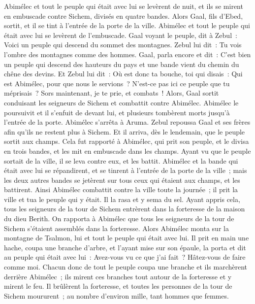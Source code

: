 \begin{multicols}{2}
Abimélec et tout le peuple qui était avec lui se levèrent de nuit, et ils se mirent en embuscade contre Sichem, divisés en quatre bandes.
Alors Gaal, fils d'Ebed, sortit, et il se tint à l'entrée de la porte de la ville. Abimélec et tout le peuple qui était avec lui se levèrent de l'embuscade.
Gaal voyant le peuple, dit à Zebul~: Voici un peuple qui descend du sommet des montagnes. Zebul lui dit~: Tu vois l'ombre des montagnes comme des hommes.
Gaal, parla encore et dit~: C'est bien un peuple qui descend des hauteurs du pays et une bande vient du chemin du chêne des devins.
Et Zebul lui dit~: Où est donc ta bouche, toi qui disais~: Qui est Abimélec, pour que nous le servions~? N'est-ce pas ici ce peuple que tu méprisais~? Sors maintenant, je te prie, et combats~!
Alors, Gaal sortit conduisant les seigneurs de Sichem et combattit contre Abimélec.
Abimélec le poursuivit et il s'enfuit de devant lui, et plusieurs tombèrent morts jusqu'à l'entrée de la porte.
Abimélec s'arrêta à Aruma. Zebul repoussa Gaal et ses frères afin qu'ils ne restent plus à Sichem.
Et il arriva, dès le lendemain, que le peuple sortit aux champs. Cela fut rapporté à Abimélec,
qui prit son peuple, et le divisa en trois bandes, et les mit en embuscade dans les champs. Ayant vu que le peuple sortait de la ville, il se leva contre eux, et les battit.
Abimélec et la bande qui était avec lui se répandirent, et se tinrent à l'entrée de la porte de la ville~; mais les deux autres bandes se jetèrent sur tous ceux qui étaient aux champs, et les battirent.
Ainsi Abimélec combattit contre la ville toute la journée~; il prit la ville et tua le peuple qui y était. Il la rasa et y sema du sel.
Ayant appris cela, tous les seigneurs de la tour de Sichem entrèrent dans la forteresse de la maison du dieu Berith.
On rapporta à Abimélec que tous les seigneurs de la tour de Sichem s'étaient assemblés dans la forteresse.
Alors Abimélec monta sur la montagne de Tsalmon, lui et tout le peuple qui était avec lui. Il prit en main une hache, coupa une branche d'arbre, et l'ayant mise sur son épaule, la porta et dit au peuple qui était avec lui~: Avez-vous vu ce que j'ai fait~? Hâtez-vous de faire comme moi.
Chacun donc de tout le peuple coupa une branche et ils marchèrent derrière Abimélec~; ils mirent ces branches tout autour de la forteresse et y mirent le feu. Il brûlèrent la forteresse, et toutes les personnes de la tour de Sichem moururent~; au nombre d'environ mille, tant hommes que femmes.

\end{multicols}
